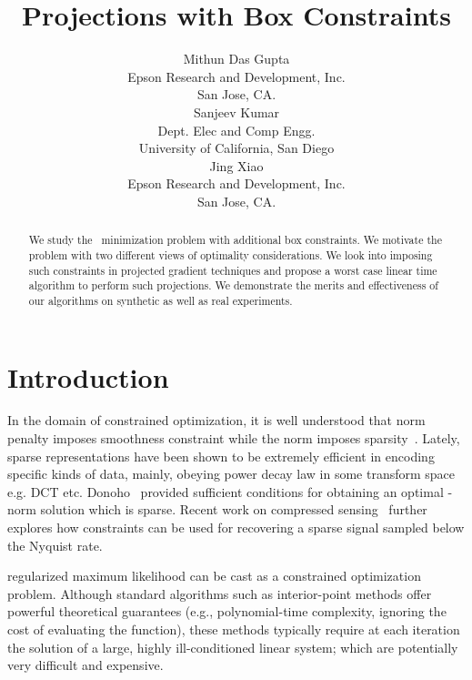 \documentclass{article}
\title{ Projections with Box Constraints}
\author{
Mithun Das Gupta  \\
Epson Research and Development, Inc. \\
San Jose, CA.\\
\And
Sanjeev Kumar \\
Dept. Elec and Comp Engg. \\
University of California, San Diego \\
\And
Jing Xiao \\
Epson Research and Development, Inc. \\
San Jose, CA. \\
}
\def\Lo{~}
\begin{document}
\maketitle

\begin{abstract}
We study the \Lo minimization problem with additional box constraints. We motivate the problem with two different views of optimality considerations. We look into imposing such constraints in projected gradient techniques and propose a worst case linear time algorithm to perform such projections.
We demonstrate the merits and effectiveness
of our algorithms on synthetic as well as real experiments.
\end{abstract}


\section{Introduction}
In the domain of constrained optimization, it is well understood that  norm penalty imposes smoothness constraint while the  norm imposes sparsity~\cite{Ng04}. Lately, sparse representations have been shown to be extremely efficient in encoding specific kinds of data, mainly, obeying power decay law in some transform space e.g. DCT etc. Donoho~\cite{Donoho04} provided sufficient conditions for obtaining an optimal -norm solution which is sparse. Recent
work on compressed sensing~\cite{Candes06,Tsaig06} further explores how  constraints can be used for recovering a sparse signal sampled below the Nyquist rate.

 regularized maximum likelihood can be cast as a constrained optimization problem. Although standard algorithms such as interior-point methods \cite{Tibshirani94,Koh07} offer powerful theoretical guarantees (e.g., polynomial-time complexity, ignoring the cost of evaluating the function), these methods typically require at each iteration the solution of a large, highly ill-conditioned linear system; which are potentially very difficult and expensive.
\end{document}
